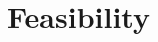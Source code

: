 \documentclass[../proposal.tex]{subfiles}
\begin{document}
\section{Feasibility}
\label{feasibility}
\end{document}
